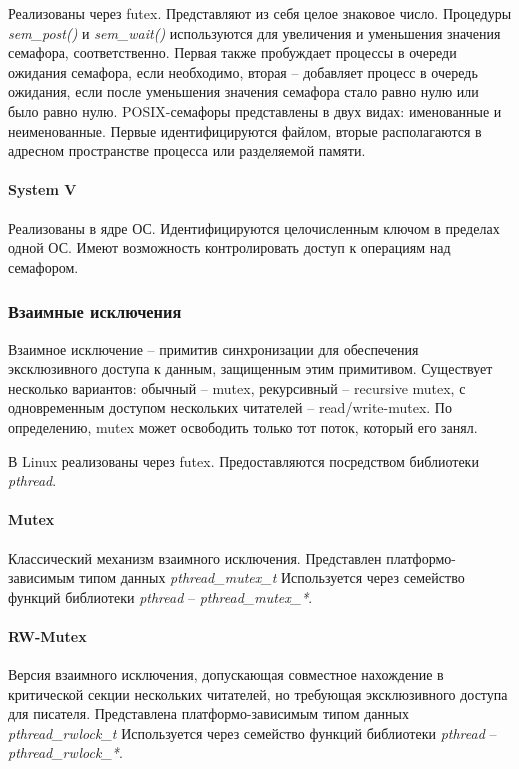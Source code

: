 Реализованы через futex. Представляют из себя целое знаковое число. Процедуры \textit{sem\_post()} и \textit{sem\_wait()} используются для увеличения и уменьшения значения семафора, соответственно. Первая также пробуждает процессы в очереди ожидания семафора, если необходимо, вторая -- добавляет процесс в очередь ожидания, если после уменьшения значения семафора стало равно нулю или было равно  нулю.
POSIX-семафоры представлены в двух видах: именованные и неименованные. Первые идентифицируются файлом, вторые располагаются в адресном пространстве процесса или разделяемой памяти.

\paragraph{System V}

Реализованы в ядре ОС. Идентифицируются целочисленным ключом в пределах одной ОС. Имеют возможность контролировать доступ к операциям над семафором.

\subsubsection{Взаимные исключения}

Взаимное исключение -- примитив синхронизации для обеспечения эксклюзивного доступа к данным, защищенным этим примитивом. Существует несколько вариантов: обычный -- mutex, рекурсивный -- recursive mutex, с одновременным доступом нескольких читателей -- read/write-mutex. По определению, mutex может освободить только тот поток, который его занял.

В Linux реализованы через futex. Предоставляются посредством библиотеки \textit{pthread}.

\paragraph{Mutex}
Классический механизм взаимного исключения. Представлен платформо-зависимым типом данных \textit{pthread\_mutex\_t} Используется через семейство функций библиотеки \textit{pthread} -- \textit{pthread\_mutex\_*}.

\paragraph{RW-Mutex}
Версия взаимного исключения, допускающая совместное нахождение в критической секции нескольких читателей, но требующая эксклюзивного доступа для писателя. Представлена платформо-зависимым типом данных \textit{pthread\_rwlock\_t} Используется через семейство функций библиотеки \textit{pthread} -- \textit{pthread\_rwlock\_*}.

